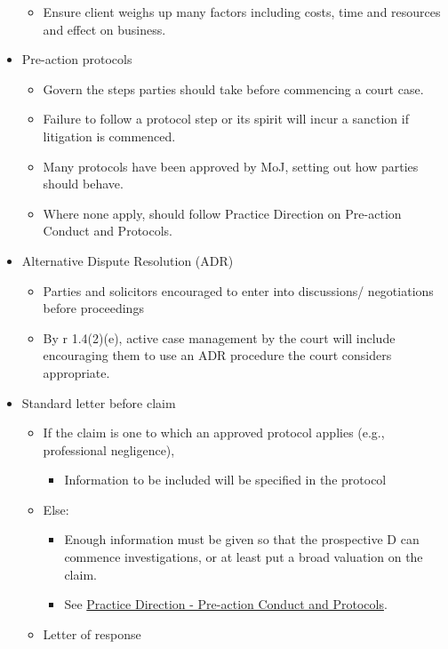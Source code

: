 \documentclass[
]{article}
\providecommand{\tightlist}{%
  \setlength{\itemsep}{0pt}\setlength{\parskip}{0pt}}
\begin{document}
\begin{itemize}
  \begin{itemize}
  \tightlist
  \item
    Ensure client weighs up many factors including costs, time and
    resources and effect on business.
  \end{itemize}
\item
  Pre-action protocols

  \begin{itemize}
  \tightlist
  \item
    Govern the steps parties should take before commencing a court case.
  \item
    Failure to follow a protocol step or its spirit will incur a
    sanction if litigation is commenced.
  \item
    Many protocols have been approved by MoJ, setting out how parties
    should behave.
  \item
    Where none apply, should follow Practice Direction on Pre-action
    Conduct and Protocols.
  \end{itemize}
\item
  Alternative Dispute Resolution (ADR)

  \begin{itemize}
  \tightlist
  \item
    Parties and solicitors encouraged to enter into discussions/
    negotiations before proceedings
  \item
    By r 1.4(2)(e), active case management by the court will include
    encouraging them to use an ADR procedure the court considers
    appropriate.
  \end{itemize}
\item
  Standard letter before claim

  \begin{itemize}
  \tightlist
  \item
    If the claim is one to which an approved protocol applies (e.g.,
    professional negligence),

    \begin{itemize}
    \tightlist
    \item
      Information to be included will be specified in the protocol
    \end{itemize}
  \item
    Else:

    \begin{itemize}
    \tightlist
    \item
      Enough information must be given so that the prospective D can
      commence investigations, or at least put a broad valuation on the
      claim.
    \item
      See
      \href{https://www.justice.gov.uk/courts/procedure-rules/civil/rules/pd_pre-action_conduct}{Practice
      Direction - Pre-action Conduct and Protocols}.
    \end{itemize}
  \item
    Letter of response


\end{itemize}
\end{itemize}
\end{document}
